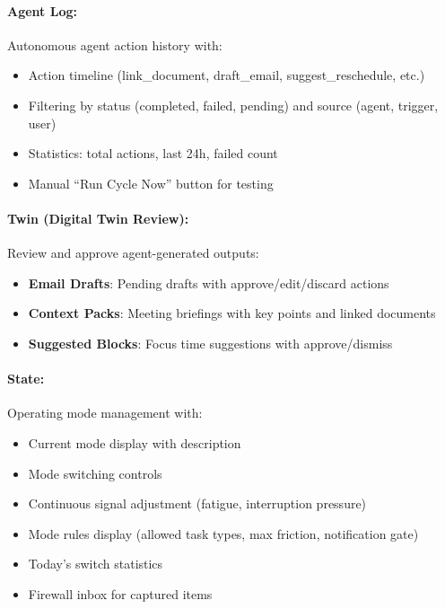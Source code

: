 \documentclass[11pt,a4paper]{article}
\begin{document}
\paragraph{Agent Log:} Autonomous agent action history with:
\begin{itemize}
    \item Action timeline (link\_document, draft\_email, suggest\_reschedule, etc.)
    \item Filtering by status (completed, failed, pending) and source (agent, trigger, user)
    \item Statistics: total actions, last 24h, failed count
    \item Manual ``Run Cycle Now'' button for testing
\end{itemize}

\paragraph{Twin (Digital Twin Review):} Review and approve agent-generated outputs:
\begin{itemize}
    \item \textbf{Email Drafts}: Pending drafts with approve/edit/discard actions
    \item \textbf{Context Packs}: Meeting briefings with key points and linked documents
    \item \textbf{Suggested Blocks}: Focus time suggestions with approve/dismiss
\end{itemize}

\paragraph{State:} Operating mode management with:
\begin{itemize}
    \item Current mode display with description
    \item Mode switching controls
    \item Continuous signal adjustment (fatigue, interruption pressure)
    \item Mode rules display (allowed task types, max friction, notification gate)
    \item Today's switch statistics
    \item Firewall inbox for captured items
\end{itemize}
\end{document}
